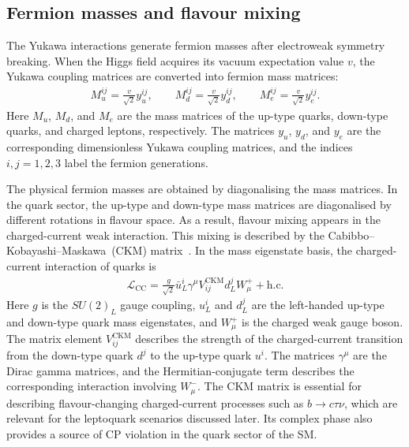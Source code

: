 \subsection{Fermion masses and flavour mixing}
\label{subsec:yukawa_flavour}

The Yukawa interactions generate fermion masses after electroweak symmetry breaking. 
When the Higgs field acquires its vacuum expectation value $v$, the Yukawa coupling matrices are converted into fermion mass matrices:
\begin{align}
    M_{u}^{ij}
    =
    \frac{v}{\sqrt{2}}y_{u}^{ij},
    \qquad
    M_{d}^{ij}
    =
    \frac{v}{\sqrt{2}}y_{d}^{ij},
    \qquad
    M_{e}^{ij}
    =
    \frac{v}{\sqrt{2}}y_{e}^{ij}.
    \label{eq:fermion_mass_matrices}
\end{align}
Here $M_{u}$, $M_{d}$, and $M_{e}$ are the mass matrices of the up-type quarks, down-type quarks, and charged leptons, respectively. 
The matrices $y_{u}$, $y_{d}$, and $y_{e}$ are the corresponding dimensionless Yukawa coupling matrices, and the indices $i,j=1,2,3$ label the fermion generations. 

The physical fermion masses are obtained by diagonalising the mass matrices. 
In the quark sector, the up-type and down-type mass matrices are diagonalised by different rotations in flavour space. 
As a result, flavour mixing appears in the charged-current weak interaction. 
This mixing is described by the Cabibbo--Kobayashi--Maskawa~(CKM) matrix~\cite{Cabibbo1963,KobayashiMaskawa1973}. 
In the mass eigenstate basis, the charged-current interaction of quarks is
\begin{align}
    \mathcal{L}_{\mathrm{CC}}
    =
    \frac{g}{\sqrt{2}}
    \bar{u}_{L}^{i}
    \gamma^{\mu}
    V_{ij}^{\mathrm{CKM}}
    d_{L}^{j}
    W_{\mu}^{+}
    +
    \mathrm{h.c.}
    \label{eq:charged_current_ckm}
\end{align}
Here $g$ is the $SU(2)_{L}$ gauge coupling, $u_{L}^{i}$ and $d_{L}^{j}$ are the left-handed up-type and down-type quark mass eigenstates, and $W_{\mu}^{+}$ is the charged weak gauge boson. 
The matrix element $V_{ij}^{\mathrm{CKM}}$ describes the strength of the charged-current transition from the down-type quark $d^{j}$ to the up-type quark $u^{i}$. 
The matrices $\gamma^{\mu}$ are the Dirac gamma matrices, and the Hermitian-conjugate term describes the corresponding interaction involving $W_{\mu}^{-}$. 
The CKM matrix is essential for describing flavour-changing charged-current processes such as $b\rightarrow c\tau\nu$, which are relevant for the leptoquark scenarios discussed later. 
Its complex phase also provides a source of CP violation in the quark sector of the SM.

